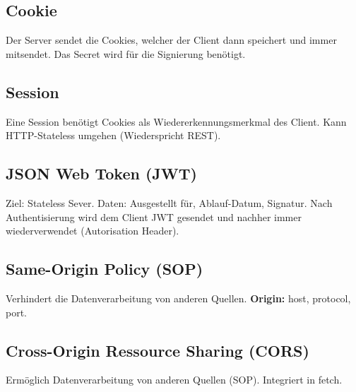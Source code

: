 \subsection{Cookie}
Der Server sendet die Cookies, welcher der Client dann speichert und immer mitsendet. Das Secret wird für die Signierung benötigt.


\subsection{Session}
Eine Session benötigt Cookies als Wiedererkennungsmerkmal des Client. Kann HTTP-Stateless umgehen (Wiederspricht REST).


\subsection{JSON Web Token (JWT)}
Ziel: Stateless Sever. Daten: Ausgestellt für, Ablauf-Datum, Signatur. Nach Authentisierung wird dem Client JWT gesendet und nachher immer wiederverwendet (Autorisation Header).

\subsection{Same-Origin Policy (SOP)}
Verhindert die Datenverarbeitung von anderen Quellen. \textbf{Origin:} host, protocol, port.

\subsection{Cross-Origin Ressource Sharing (CORS)}
Ermöglich Datenverarbeitung von anderen Quellen (SOP). Integriert in fetch. 

